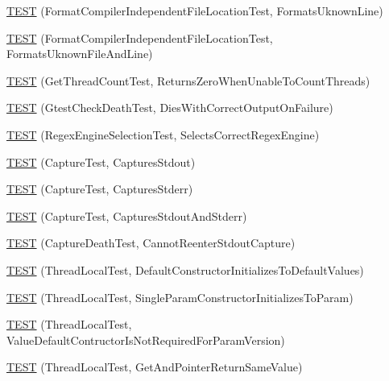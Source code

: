 \begin{DoxyCompactItemize}
\item 
\hyperlink{namespacetesting_1_1internal_a0315a64a661f249628f2884080e0614f}{T\+E\+ST} (Format\+Compiler\+Independent\+File\+Location\+Test, Formats\+Uknown\+Line)
\item 
\hyperlink{namespacetesting_1_1internal_a8b9aee556f3dec6e67c35830ba55e0bd}{T\+E\+ST} (Format\+Compiler\+Independent\+File\+Location\+Test, Formats\+Uknown\+File\+And\+Line)
\item 
\hyperlink{namespacetesting_1_1internal_a5ad8299ae9325382f01b945f4f81711e}{T\+E\+ST} (Get\+Thread\+Count\+Test, Returns\+Zero\+When\+Unable\+To\+Count\+Threads)
\item 
\hyperlink{namespacetesting_1_1internal_afabff70df09a0e4fcda96dd36460c2b9}{T\+E\+ST} (Gtest\+Check\+Death\+Test, Dies\+With\+Correct\+Output\+On\+Failure)
\item 
\hyperlink{namespacetesting_1_1internal_a198f7132f76dd44d48dac54dc5d38fbb}{T\+E\+ST} (Regex\+Engine\+Selection\+Test, Selects\+Correct\+Regex\+Engine)
\item 
\hyperlink{namespacetesting_1_1internal_a0b658d88cea3a2fe6775b1b269c0204b}{T\+E\+ST} (Capture\+Test, Captures\+Stdout)
\item 
\hyperlink{namespacetesting_1_1internal_abbc9510a4f690912c32835213d95198f}{T\+E\+ST} (Capture\+Test, Captures\+Stderr)
\item 
\hyperlink{namespacetesting_1_1internal_a341ff65f3ca44b27fc51f03a9a05bee8}{T\+E\+ST} (Capture\+Test, Captures\+Stdout\+And\+Stderr)
\item 
\hyperlink{namespacetesting_1_1internal_a325a786fb22b87e5aa8d8f584b42ab09}{T\+E\+ST} (Capture\+Death\+Test, Cannot\+Reenter\+Stdout\+Capture)
\item 
\hyperlink{namespacetesting_1_1internal_af366e28e373f36480decc2ea586f48f0}{T\+E\+ST} (Thread\+Local\+Test, Default\+Constructor\+Initializes\+To\+Default\+Values)
\item 
\hyperlink{namespacetesting_1_1internal_a5a52dd578217050e621ebd2aace97a70}{T\+E\+ST} (Thread\+Local\+Test, Single\+Param\+Constructor\+Initializes\+To\+Param)
\item 
\hyperlink{namespacetesting_1_1internal_a6dffc8331590224259b60e855ad07d03}{T\+E\+ST} (Thread\+Local\+Test, Value\+Default\+Contructor\+Is\+Not\+Required\+For\+Param\+Version)
\item 
\hyperlink{namespacetesting_1_1internal_a0e7c2d58a313bec0821df19f44351d84}{T\+E\+ST} (Thread\+Local\+Test, Get\+And\+Pointer\+Return\+Same\+Value)
\item 

\end{DoxyCompactItemize}
